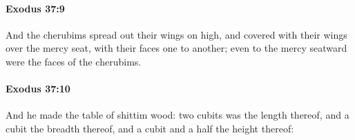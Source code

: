 		\paragraph{Exodus 37:9} %
			\label{EXODUS-37-9}

			And the cherubims spread out their wings on high, and covered with their wings over the mercy seat, with their faces one to another; even to the mercy seatward were the faces of the cherubims.


		\paragraph{Exodus 37:10} %
			\label{EXODUS-37-10}

			And he made the table of shittim wood: two cubits was the length thereof, and a cubit the breadth thereof, and a cubit and a half the height thereof:


